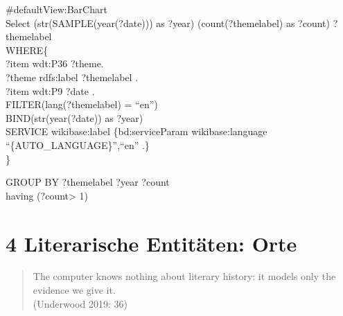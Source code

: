 \documentclass[
  12pt,
  letterpaper,
  DIV=11,
  numbers=noendperiod]{scrreprt}
\begin{document}
\#defaultView:BarChart\\
Select (str(SAMPLE(year(?date))) as ?year) (count(?themelabel) as
?count) ?themelabel\\
WHERE\{\\
?item wdt:P36 ?theme.\\
?theme rdfs:label ?themelabel .\\
?item wdt:P9 ?date .\\
FILTER(lang(?themelabel) = ``en'')\\
BIND(str(year(?date)) as ?year)\\
SERVICE wikibase:label \{bd:serviceParam wikibase:language
``\{AUTO\_LANGUAGE\}'',``en'' .\}\\
\}

GROUP BY ?themelabel ?year ?count\\
having (?count\textgreater{} 1)


\chapter{4 Literarische Entitäten:
Orte}\label{literarische-entituxe4ten-orte}

\begin{quote}
The computer knows nothing about literary history: it models only the
evidence we give it.\\
(Underwood 2019: 36)
\end{quote}
\end{document}
